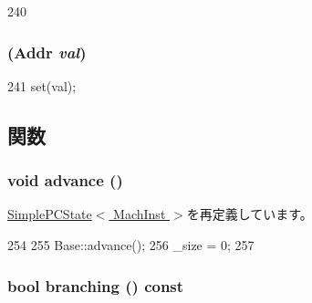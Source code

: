 \begin{DoxyCode}
240 {}
\end{DoxyCode}
\hypertarget{classX86ISA_1_1PCState_a52e3b52fc58e6f5d06eb20d00ba016b1}{
\subsubsection[{PCState}]{ ({\bf Addr} {\em val})}}
\label{classX86ISA_1_1PCState_a52e3b52fc58e6f5d06eb20d00ba016b1}



\begin{DoxyCode}
241 { set(val); }
\end{DoxyCode}


\subsection{関数}
\hypertarget{classX86ISA_1_1PCState_a8903a4e9f3d5fb42d0faa9d53e21d85c}{
\subsubsection[{advance}]{\setlength{\rightskip}{0pt plus 5cm}void advance ()}}
\label{classX86ISA_1_1PCState_a8903a4e9f3d5fb42d0faa9d53e21d85c}


\hyperlink{classGenericISA_1_1SimplePCState_a8903a4e9f3d5fb42d0faa9d53e21d85c}{SimplePCState$<$ MachInst $>$}を再定義しています。


\begin{DoxyCode}
254         {
255             Base::advance();
256             _size = 0;
257         }
\end{DoxyCode}
\hypertarget{classX86ISA_1_1PCState_ae3f0eb15a9382eefff6b00cf7999c2e3}{
\subsubsection[{branching}]{\setlength{\rightskip}{0pt plus 5cm}bool branching () const}}
\label{classX86ISA_1_1PCState_ae3f0eb15a9382eefff6b00cf7999c2e3}


